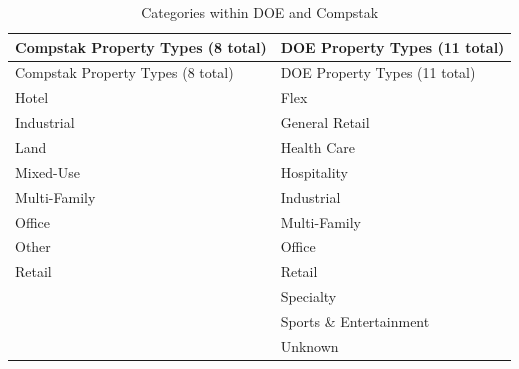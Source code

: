 \documentclass[
  12pt]{article}
\begin{document}
\begin{longtable}[]{@{}ll@{}}
\caption{Categories within DOE and
Compstak}\label{tbl-Category_Compare}\tabularnewline
\toprule\noalign{}
Compstak Property Types (8 total) & DOE Property Types (11 total) \\
\midrule\noalign{}
\endfirsthead
\toprule\noalign{}
Compstak Property Types (8 total) & DOE Property Types (11 total) \\
\midrule\noalign{}
\endhead
\bottomrule\noalign{}
\endlastfoot
Hotel & Flex \\
Industrial & General Retail \\
Land & Health Care \\
Mixed-Use & Hospitality \\
Multi-Family & Industrial \\
Office & Multi-Family \\
Other & Office \\
Retail & Retail \\
& Specialty \\
& Sports \& Entertainment \\
& Unknown \\
\end{longtable}
\end{document}
